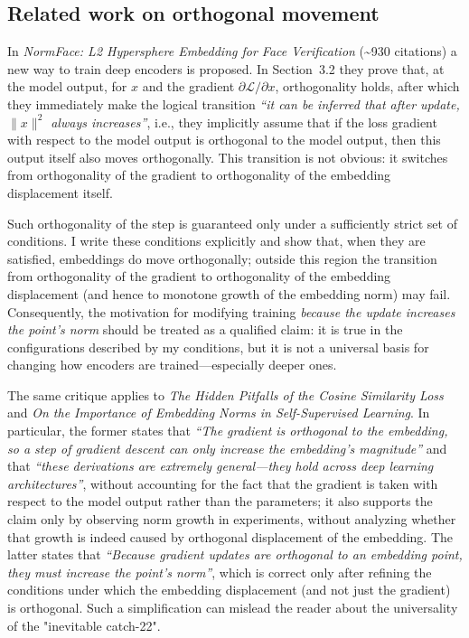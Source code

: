 \subsection{Related work on orthogonal movement}

In \emph{NormFace: L2 Hypersphere Embedding for Face Verification} (\textasciitilde930 citations) a new way to train deep encoders is proposed. In Section~3.2 they prove that, at the model output, for $x$ and the gradient $\partial\mathcal{L}/\partial x$, orthogonality holds, after which they immediately make the logical transition \emph{``it can be inferred that after update, $\|x\|^2$ always increases''}, i.e., they implicitly assume that if the loss gradient with respect to the model output is orthogonal to the model output, then this output itself also moves orthogonally. This transition is not obvious: it switches from orthogonality of the gradient to orthogonality of the embedding displacement itself.

Such orthogonality of the step is guaranteed only under a sufficiently strict set of conditions. I write these conditions explicitly and show that, when they are satisfied, embeddings do move orthogonally; outside this region the transition from orthogonality of the gradient to orthogonality of the embedding displacement (and hence to monotone growth of the embedding norm) may fail. Consequently, the motivation for modifying training \emph{because the update increases the point's norm} should be treated as a qualified claim: it is true in the configurations described by my conditions, but it is not a universal basis for changing how encoders are trained—especially deeper ones.

The same critique applies to \emph{The Hidden Pitfalls of the Cosine Similarity Loss} and \emph{On the Importance of Embedding Norms in Self-Supervised Learning}. In particular, the former states that \emph{``The gradient is orthogonal to the embedding, so a step of gradient descent can only increase the embedding's magnitude''} and that \emph{``these derivations are extremely general—they hold across deep learning architectures''}, without accounting for the fact that the gradient is taken with respect to the model output rather than the parameters; it also supports the claim only by observing norm growth in experiments, without analyzing whether that growth is indeed caused by orthogonal displacement of the embedding. The latter states that \emph{``Because gradient updates are orthogonal to an embedding point, they must increase the point’s norm''}, which is correct only after refining the conditions under which the embedding displacement (and not just the gradient) is orthogonal. Such a simplification can mislead the reader about the universality of the "inevitable catch-22".

